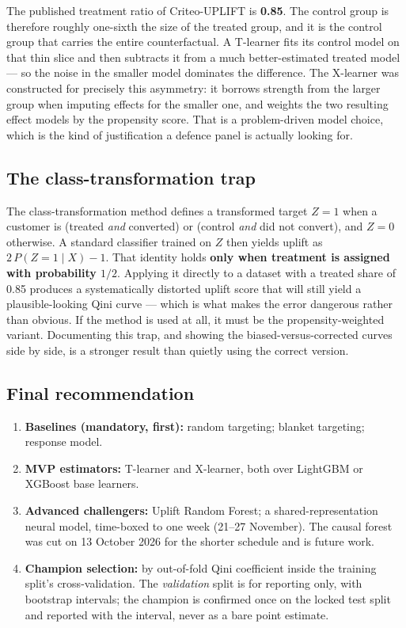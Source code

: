 \documentclass[11pt,a4paper]{article}
\begin{document}
\begin{keybox}
The published treatment ratio of Criteo-UPLIFT is \textbf{0.85}. The control group is therefore
roughly one-sixth the size of the treated group, and it is the control group that carries the
entire counterfactual. A T-learner fits its control model on that thin slice and then subtracts it
from a much better-estimated treated model --- so the noise in the smaller model dominates the
difference. The X-learner was constructed for precisely this asymmetry: it borrows strength from
the larger group when imputing effects for the smaller one, and weights the two resulting effect
models by the propensity score. That is a problem-driven model choice, which is the kind of
justification a defence panel is actually looking for.
\end{keybox}

\subsection{The class-transformation trap}
\label{sec:ct-trap}

\begin{alertbox}
The class-transformation method defines a transformed target $Z = 1$ when a customer is
(treated \emph{and} converted) or (control \emph{and} did not convert), and $Z = 0$ otherwise.
A standard classifier trained on $Z$ then yields uplift as $2\,P(Z{=}1\mid X) - 1$. That identity
holds \textbf{only when treatment is assigned with probability $1/2$}. Applying it directly to a
dataset with a treated share of 0.85 produces a systematically distorted uplift score that will
still yield a plausible-looking Qini curve --- which is what makes the error dangerous rather than
obvious. If the method is used at all, it must be the propensity-weighted variant. Documenting this
trap, and showing the biased-versus-corrected curves side by side, is a stronger result than
quietly using the correct version.
\end{alertbox}

\subsection{Final recommendation}

\begin{enumerate}
\item \textbf{Baselines (mandatory, first):} random targeting; blanket targeting; response model.
\item \textbf{MVP estimators:} T-learner and X-learner, both over LightGBM or XGBoost base learners.
\item \textbf{Advanced challengers:} Uplift Random Forest; a shared-representation neural model,
time-boxed to one week (21--27 November). The causal forest was cut on 13 October 2026 for the
shorter schedule and is future work.
\item \textbf{Champion selection:} by out-of-fold Qini coefficient inside the training split's
cross-validation. The \emph{validation} split is for reporting only, with bootstrap intervals; the
champion is confirmed once on the locked test split and reported with the interval, never as a bare
point estimate.
\end{enumerate}
\end{document}
